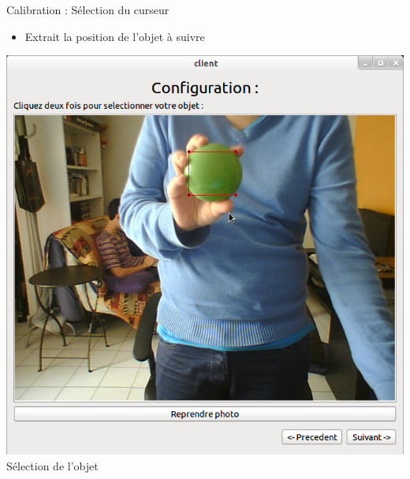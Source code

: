 \documentclass{beamer}
\begin{document}
		\begin{frame}{Calibration : Sélection du curseur}
			\begin{itemize}
				\item{Extrait la position de l'objet à suivre}
			\end{itemize}
			\begin{center}
				\includegraphics[scale=0.25]{Capture1.png}\\
				Sélection de l'objet
			\end{center}
		
		\end{frame}
\end{document}
